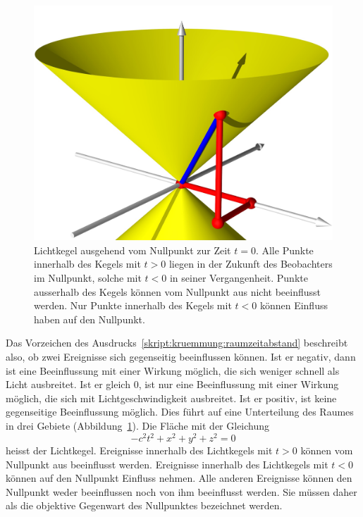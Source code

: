 \begin{figure}
\centering
\includegraphics[width=\hsize]{chapters/3d/lichtkegel.jpg}
\caption{Lichtkegel ausgehend vom Nullpunkt zur Zeit $t=0$.
Alle Punkte innerhalb des Kegels mit $t>0$ liegen in der Zukunft des
Beobachters im Nullpunkt, solche mit $t<0$ in seiner Vergangenheit.
Punkte ausserhalb des Kegels können vom Nullpunkt aus nicht
beeinflusst werden.
Nur Punkte innerhalb des Kegels mit $t<0$ können Einfluss haben
auf den Nullpunkt.
\label{skript:kruemmung:fig:lichtkegel}}
\end{figure}

Das Vorzeichen des Ausdrucks~\eqref{skript:kruemmung:raumzeitabstand}
beschreibt also, ob zwei Ereignisse sich gegenseitig beeinflussen
können. 
Ist er negativ, dann ist eine Beeinflussung mit einer Wirkung möglich,
die sich weniger schnell als Licht ausbreitet.
Ist er gleich $0$, ist nur eine Beeinflussung mit einer Wirkung möglich,
die sich mit Lichtgeschwindigkeit ausbreitet.
Ist er positiv, ist keine gegenseitige Beeinflussung möglich.
Dies führt auf eine Unterteilung des Raumes in drei Gebiete
(Abbildung~\ref{skript:kruemmung:fig:lichtkegel}).
Die Fläche mit der Gleichung
\[
-c^2t^2+x^2+y^2+z^2=0
\]
heisst der Lichtkegel.
%
Ereignisse innerhalb des Lichtkegels mit $t>0$ können vom Nullpunkt aus
beeinflusst werden.
Ereignisse innerhalb des Lichtkegels mit $t<0$ können auf den Nullpunkt
Einfluss nehmen.
Alle anderen Ereignisse können den Nullpunkt weder beeinflussen
noch von ihm beeinflusst werden.
Sie müssen daher als die objektive Gegenwart des Nullpunktes bezeichnet
werden.

